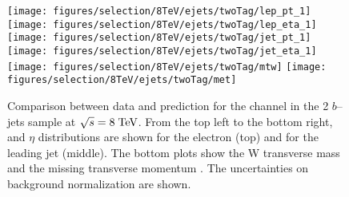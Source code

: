 %
\begin{figure}
  \centering
  \texttt{[image: figures/selection/8TeV/ejets/twoTag/lep\_pt\_1]}
  \texttt{[image: figures/selection/8TeV/ejets/twoTag/lep\_eta\_1]}
  \texttt{[image: figures/selection/8TeV/ejets/twoTag/jet\_pt\_1]}
  \texttt{[image: figures/selection/8TeV/ejets/twoTag/jet\_eta\_1]}
  \texttt{[image: figures/selection/8TeV/ejets/twoTag/mtw]}
  \texttt{[image: figures/selection/8TeV/ejets/twoTag/met]}
  \caption{Comparison between data and prediction for the \ejets{}
    channel in the 2 $b$--jets
    sample at $\sqrt{s} = 8 \; \mathrm{TeV}{}$.  From the top left to the bottom right,
   \pt{} and $\eta$ distributions are shown for the
    electron (top) and for the leading jet (middle). The bottom plots
    show the W transverse mass \mtw{} and the missing transverse
    momentum \met{}. 
    The uncertainties on background normalization are shown.
  }
  \label{fig:2012ele_2tag}
\end{figure}




